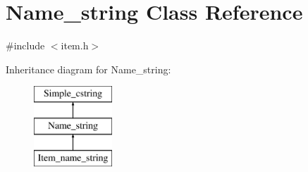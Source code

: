 \hypertarget{className__string}{}\section{Name\+\_\+string Class Reference}
\label{className__string}


{\ttfamily \#include $<$item.\+h$>$}

Inheritance diagram for Name\+\_\+string\+:\begin{figure}[H]
\begin{center}
\leavevmode
\includegraphics[height=3.000000cm]{className__string}
\end{center}
\end{figure}
